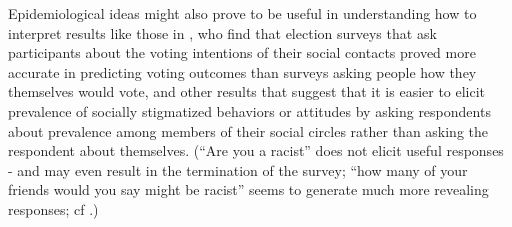 Epidemiological ideas might also prove to be useful in understanding how to interpret results like those in \cite{galesic2018asking}, who find that election surveys that ask participants about the voting intentions of their social contacts proved more accurate in predicting voting outcomes than surveys asking people how they themselves would vote, and other results that suggest that it is easier to elicit prevalence of socially stigmatized behaviors or attitudes by asking respondents about prevalence among members of their social circles rather than asking the respondent about themselves.  (``Are you a racist'' does not elicit useful responses - and may even result in the termination of the survey; ``how many of your friends would you say might be racist'' seems to generate much more revealing responses; cf \cite{radas2021predicted}.)